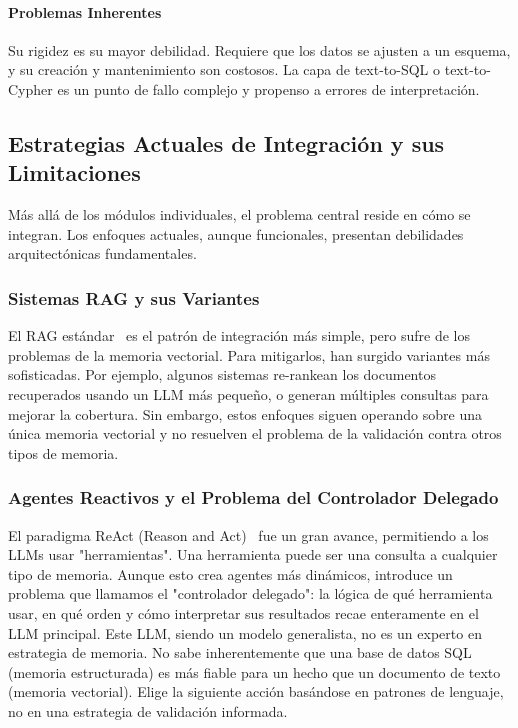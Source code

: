 \documentclass[conference]{IEEEtran}
\begin{document}
\paragraph{Problemas Inherentes} Su rigidez es su mayor debilidad. Requiere que los datos se ajusten a un esquema, y su creación y mantenimiento son costosos. La capa de text-to-SQL o text-to-Cypher es un punto de fallo complejo y propenso a errores de interpretación.

\subsection{Estrategias Actuales de Integración y sus Limitaciones}
Más allá de los módulos individuales, el problema central reside en cómo se integran. Los enfoques actuales, aunque funcionales, presentan debilidades arquitectónicas fundamentales.

\subsubsection{Sistemas RAG y sus Variantes}
El RAG estándar~\cite{lewis2020retrieval} es el patrón de integración más simple, pero sufre de los problemas de la memoria vectorial. Para mitigarlos, han surgido variantes más sofisticadas. Por ejemplo, algunos sistemas re-rankean los documentos recuperados usando un LLM más pequeño, o generan múltiples consultas para mejorar la cobertura. Sin embargo, estos enfoques siguen operando sobre una única memoria vectorial y no resuelven el problema de la validación contra otros tipos de memoria.

\subsubsection{Agentes Reactivos y el Problema del Controlador Delegado}
El paradigma ReAct (Reason and Act)~\cite{yao2022react} fue un gran avance, permitiendo a los LLMs usar "herramientas". Una herramienta puede ser una consulta a cualquier tipo de memoria. Aunque esto crea agentes más dinámicos, introduce un problema que llamamos el "controlador delegado": la lógica de qué herramienta usar, en qué orden y cómo interpretar sus resultados recae enteramente en el LLM principal. Este LLM, siendo un modelo generalista, no es un experto en estrategia de memoria. No sabe inherentemente que una base de datos SQL (memoria estructurada) es más fiable para un hecho que un documento de texto (memoria vectorial). Elige la siguiente acción basándose en patrones de lenguaje, no en una estrategia de validación informada.
\end{document}
